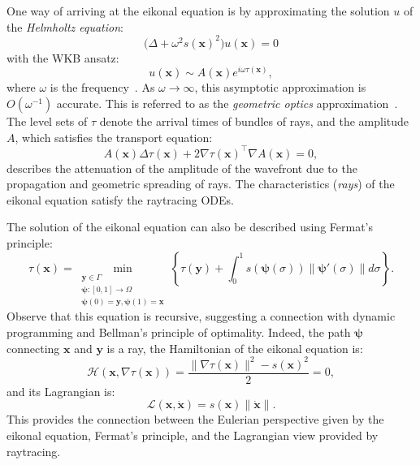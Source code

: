 \documentclass{siamart190516}
\newcommand{\m}[1]{\boldsymbol{#1}}
\newcommand{\mpsi}{\m{\psi}}
\begin{document}
One way of arriving at the eikonal equation is by approximating the
solution $u$ of the \emph{Helmholtz equation}:
\begin{equation}
  \Big(\Delta + \omega^2 s(\m{x})^2\Big) u(\m{x}) = 0
\end{equation}
with the WKB ansatz:
\begin{equation}
  u(\m{x}) \sim A(\m{x}) e^{i \omega \tau(\m{x})},
\end{equation}
where $\omega$ is the frequency~\cite{Popov:2002aa}. As
$\omega \to \infty$, this asymptotic approximation is $O(\omega^{-1})$
accurate. This is referred to as the \emph{geometric optics}
approximation~\cite{Benamou:2003aa}. The level sets of $\tau$ denote
the arrival times of bundles of rays, and the amplitude $A$, which
satisfies the transport equation:
\begin{equation}\label{eq:transport-equation}
  A(\m{x}) \Delta \tau(\m{x}) + 2 \nabla \tau(\m{x})^\top \nabla A(\m{x}) = 0,
\end{equation}
describes the attenuation of the amplitude of the wavefront due to the
propagation and geometric spreading of rays. The characteristics
(\emph{rays}) of the eikonal equation satisfy the raytracing ODEs.

The solution of the eikonal equation can also be described using
Fermat's principle:
\begin{equation}\label{eq:fermats-principle}
  \tau(\m{x}) = \min_{\substack{\m{y} \in \Gamma \\ \mpsi : [0, 1] \to \Omega \\ \mpsi(0) = \m{y}, \mpsi(1) = \m{x}}} \left\{\tau(\m{y}) + \int_0^1 s(\mpsi(\sigma)) \|\mpsi'(\sigma)\|d\sigma\right\}.
\end{equation}
Observe that this equation is recursive, suggesting a connection with
dynamic programming and Bellman's principle of optimality. Indeed, the
path $\mpsi$ connecting $\m{x}$ and $\m{y}$ is a ray, the
Hamiltonian of the eikonal equation is:
\begin{equation}
  \mathcal{H}(\m{x}, \nabla \tau(\m{x})) = \frac{\|\nabla\tau(\m{x})\|^2 - s(\m{x})^2}{2} = 0,
\end{equation}
and its Lagrangian is:
\begin{equation}
  \mathcal{L}(\m{x}, \dot{\m{x}}) = s(\m{x})\|\dot{\m{x}}\|.
\end{equation}
This provides the connection between the Eulerian perspective given by
the eikonal equation, Fermat's principle, and the Lagrangian view
provided by raytracing.
\end{document}
